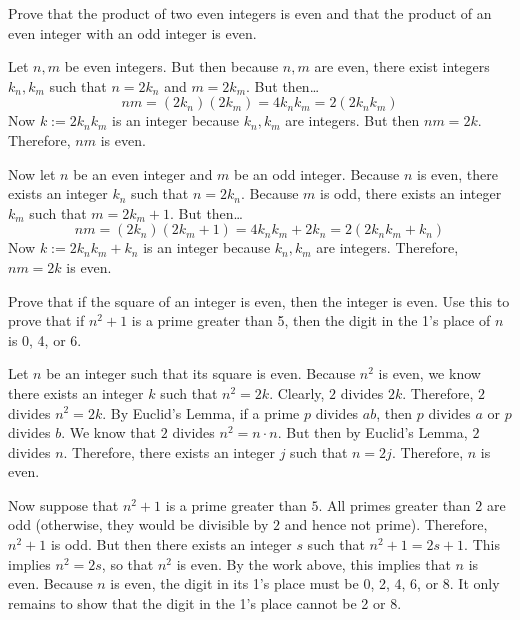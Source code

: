 \documentclass[11pt,letterpaper]{article}
\begin{document}

 Prove that the product of two even integers is even and that the product of an even integer with an odd integer is even. \pspace

\sol Let $n, m$ be even integers. But then because $n, m$ are even, there exist integers $k_n, k_m$ such that $n= 2k_n$ and $m= 2k_m$. But then\dots
	\[
	nm= (2k_n)(2k_m)= 4k_n k_m= 2(2k_n k_m)
	\]
Now $k:= 2k_n k_m$ is an integer because $k_n, k_m$ are integers. But then $nm= 2k$. Therefore, $nm$ is even. \pspace

Now let $n$ be an even integer and $m$ be an odd integer. Because $n$ is even, there exists an integer $k_n$ such that $n= 2k_n$. Because $m$ is odd, there exists an integer $k_m$ such that $m= 2k_m + 1$. But then\dots
	\[
	nm= (2k_n)(2k_m + 1)= 4k_n k_m + 2k_n= 2(2k_n k_m + k_n)
	\]
Now $k:= 2k_n k_m + k_n$ is an integer because $k_n, k_m$ are integers. Therefore, $nm= 2k$ is even. 



\newpage



 Prove that if the square of an integer is even, then the integer is even. Use this to prove that if $n^2 + 1$ is a prime greater than 5, then the digit in the 1's place of $n$ is 0, 4, or 6. \pspace

\sol Let $n$ be an integer such that its square is even. Because $n^2$ is even, we know there exists an integer $k$ such that $n^2= 2k$. Clearly, $2$ divides $2k$. Therefore, $2$ divides $n^2= 2k$. By Euclid's Lemma, if a prime $p$ divides $ab$, then $p$ divides $a$ or $p$ divides $b$. We know that $2$ divides $n^2= n \cdot n$. But then by Euclid's Lemma, $2$ divides $n$. Therefore, there exists an integer $j$ such that $n= 2j$. Therefore, $n$ is even. \pspace

Now suppose that $n^2 + 1$ is a prime greater than $5$. All primes greater than $2$ are odd (otherwise, they would be divisible by $2$ and hence not prime). Therefore, $n^2 + 1$ is odd. But then there exists an integer $s$ such that $n^2 + 1= 2s + 1$. This implies $n^2= 2s$, so that $n^2$ is even. By the work above, this implies that $n$ is even. Because $n$ is even, the digit in its 1's place must be 0, 2, 4, 6, or 8. It only remains to show that the digit in the 1's place cannot be 2 or 8.
\end{document}
